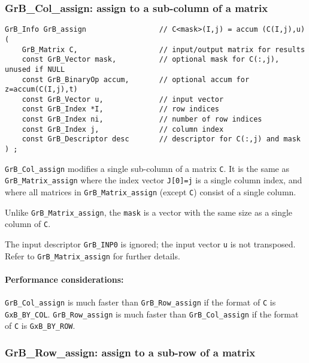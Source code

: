 \documentclass[12pt]{article}
\begin{document}
\newpage
\subsubsection{{\sf GrB\_Col\_assign:} assign to a sub-column of a matrix}
\label{assign_column}

\begin{mdframed}[userdefinedwidth=6in]
{\footnotesize
\begin{verbatim}
GrB_Info GrB_assign                 // C<mask>(I,j) = accum (C(I,j),u)
(
    GrB_Matrix C,                   // input/output matrix for results
    const GrB_Vector mask,          // optional mask for C(:,j), unused if NULL
    const GrB_BinaryOp accum,       // optional accum for z=accum(C(I,j),t)
    const GrB_Vector u,             // input vector
    const GrB_Index *I,             // row indices
    const GrB_Index ni,             // number of row indices
    const GrB_Index j,              // column index
    const GrB_Descriptor desc       // descriptor for C(:,j) and mask
) ;
\end{verbatim} } \end{mdframed}

\verb'GrB_Col_assign' modifies a single sub-column of a matrix \verb'C'.  It is
the same as \verb'GrB_Matrix_assign' where the index vector \verb'J[0]=j' is a
single column index, and where all matrices in \verb'GrB_Matrix_assign' (except
\verb'C') consist of a single column.

Unlike \verb'GrB_Matrix_assign', the \verb'mask' is a vector with the same size
as a single column of \verb'C'.

The input descriptor \verb'GrB_INP0' is ignored; the input vector \verb'u' is
not transposed.  Refer to \verb'GrB_Matrix_assign' for further details.

\paragraph{\bf Performance considerations:} %
\verb'GrB_Col_assign' is much faster than \verb'GrB_Row_assign' if the format
of \verb'C' is \verb'GxB_BY_COL'.  \verb'GrB_Row_assign' is much faster than
\verb'GrB_Col_assign' if the format of \verb'C' is \verb'GxB_BY_ROW'.

\newpage
\subsubsection{{\sf GrB\_Row\_assign:} assign to a sub-row of a matrix}
\label{assign_row}
\end{document}
